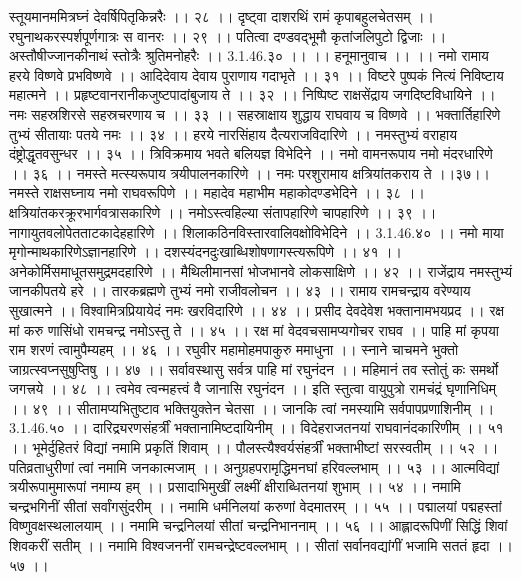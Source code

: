 स्तूयमानममित्रघ्नं देवर्षिपितृकिन्नरैः ।। २८ ।।
दृष्ट्वा दाशरथिं रामं कृपाबहुलचेतसम् ।।
रघुनाथकरस्पर्शपूर्णगात्रः स वानरः ।। २९ ।।
पतित्वा दण्डवद्भूमौ कृतांजलिपुटो द्विजाः ।।
अस्तौषीज्जानकीनाथं स्तोत्रैः श्रुतिमनोहरैः ।। 3.1.46.३० ।।
।। हनूमानुवाच ।। ।।
नमो रामाय हरये विष्णवे प्रभविष्णवे ।।
आदिदेवाय देवाय पुराणाय गदाभृते ।। ३१ ।।
विष्टरे पुष्पकं नित्यं निविष्टाय महात्मने ।।
प्रहृष्टवानरानीकजुष्टपादांबुजाय ते ।। ३२ ।।
निष्पिष्ट राक्षसेंद्राय जगदिष्टविधायिने ।।
नमः सहस्रशिरसे सहस्रचरणाय च ।। ३३ ।।
सहस्राक्षाय शुद्धाय राघवाय च विष्णवे ।।
भक्तार्तिहारिणे तुभ्यं सीतायाः पतये नमः ।। ३४ ।।
हरये नारसिंहाय दैत्यराजविदारिणे ।।
नमस्तुभ्यं वराहाय दंष्ट्रोद्धृतवसुन्धर ।। ३५ ।।
त्रिविक्रमाय भवते बलियज्ञ विभेदिने ।।
नमो वामनरूपाय नमो मंदरधारिणे ।। ३६ ।।
नमस्ते मत्स्यरूपाय त्रयीपालनकारिणे ।।
नमः परशुरामाय क्षत्रियांतकराय ते ।।३७।।
नमस्ते राक्षसघ्नाय नमो राघवरूपिणे ।।
महादेव महाभीम महाकोदण्डभेदिने ।। ३८ ।।
क्षत्रियांतकरक्रूरभार्गवत्रासकारिणे ।।
नमोऽस्त्वहिल्या संतापहारिणे चापहारिणे ।। ३९ ।।
नागायुतवलोपेतताटकादेहहारिणे ।।
शिलाकठिनविस्तारवालिवक्षोविभेदिने ।। 3.1.46.४० ।।
नमो माया मृगोन्माथकारिणेऽज्ञानहारिणे ।।
दशस्यंदनदुःखाब्धिशोषणागस्त्यरूपिणे ।। ४१ ।।
अनेकोर्मिसमाधूतसमुद्रमदहारिणे ।।
मैथिलीमानसां भोजभानवे लोकसाक्षिणे ।। ४२ ।।
राजेंद्राय नमस्तुभ्यं जानकीपतये हरे ।।
तारकब्रह्मणे तुभ्यं नमो राजीवलोचन ।। ४३ ।।
रामाय रामचन्द्राय वरेण्याय सुखात्मने ।।
विश्वामित्रप्रियायेदं नमः खरविदारिणे ।। ४४ ।।
प्रसीद देवदेवेश भक्तानामभयप्रद ।।
रक्ष मां करु णासिंधो रामचन्द्र नमोऽस्तु ते ।। ४५ ।।
रक्ष मां वेदवचसामप्यगोचर राघव ।।
पाहि मां कृपया राम शरणं त्वामुपैम्यहम् ।। ४६ ।।
रघुवीर महामोहमपाकुरु ममाधुना ।।
स्नाने चाचमने भुक्तो जाग्रत्स्वप्नसुषुप्तिषु ।। ४७ ।।
सर्वावस्थासु सर्वत्र पाहि मां रघुनंदन ।।
महिमानं तव स्तोतुं कः समर्थो जगत्त्रये ।। ४८ ।।
त्वमेव त्वन्महत्त्वं वै जानासि रघुनंदन ।।
इति स्तुत्वा वायुपुत्रो रामचंद्रं घृणानिधिम् ।। ४९ ।।
सीतामप्यभितुष्टाव भक्तियुक्तेन चेतसा ।।
जानकि त्वां नमस्यामि सर्वपापप्रणाशिनीम् ।। 3.1.46.५० ।।
दारिद्र्यरणसंहर्त्रीं भक्तानामिष्टदायिनीम् ।।
विदेहराजतनयां राघवानंदकारिणीम् ।। ५१ ।।
भूमेर्दुहितरं विद्यां नमामि प्रकृतिं शिवाम् ।।
पौलस्त्यैश्वर्यसंहर्त्रीं भक्ताभीष्टां सरस्वतीम् ।। ५२ ।।
पतिव्रताधुरीणां त्वां नमामि जनकात्मजाम् ।।
अनुग्रहपरामृद्धिमनघां हरिवल्लभाम् ।। ५३ ।।
आत्मविद्यां त्रयीरूपामुमारूपां नमाम्य हम् ।।
प्रसादाभिमुखीं लक्ष्मीं क्षीराब्धितनयां शुभाम् ।। ५४ ।।
नमामि चन्द्रभगिनीं सीतां सर्वांगसुंदरीम् ।।
नमामि धर्मनिलयां करुणां वेदमातरम् ।। ५५ ।।
पद्मालयां पद्महस्तां विष्णुवक्षस्थलालयाम् ।।
नमामि चन्द्रनिलयां सीतां चन्द्रनिभाननाम् ।। ५६ ।।
आह्लादरूपिणीं सिद्धिं शिवां शिवकरीं सतीम् ।।
नमामि विश्वजननीं रामचन्द्रेष्टवल्लभाम् ।।
सीतां सर्वानवद्यांगीं भजामि सततं हृदा ।। ५७ ।।
